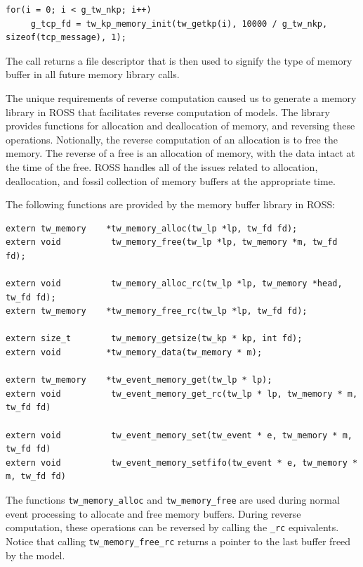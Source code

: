 \documentclass[conference,onecolumn]{IEEEtran}
\begin{document}
\begin{small}\begin{verbatim}
for(i = 0; i < g_tw_nkp; i++)
     g_tcp_fd = tw_kp_memory_init(tw_getkp(i), 10000 / g_tw_nkp, sizeof(tcp_message), 1);
\end{verbatim}\end{small}

The call returns a file descriptor that is then used to signify the type of memory buffer in all future memory library calls.

The unique requirements of reverse computation caused us to generate a memory library in ROSS that facilitates reverse computation of models.  The library provides functions for allocation and deallocation of memory, and reversing these operations.  Notionally, the reverse computation of an allocation is to free the memory.  The reverse of a free is an allocation of memory, with the data intact at the time of the free.  ROSS handles all of the issues related to allocation, deallocation, and fossil collection of memory buffers at the appropriate time.

The following functions are provided by the memory buffer library in ROSS:

\begin{small}\begin{verbatim}
extern tw_memory    *tw_memory_alloc(tw_lp *lp, tw_fd fd);
extern void          tw_memory_free(tw_lp *lp, tw_memory *m, tw_fd fd);

extern void          tw_memory_alloc_rc(tw_lp *lp, tw_memory *head, tw_fd fd);
extern tw_memory    *tw_memory_free_rc(tw_lp *lp, tw_fd fd);

extern size_t        tw_memory_getsize(tw_kp * kp, int fd);
extern void         *tw_memory_data(tw_memory * m);

extern tw_memory    *tw_event_memory_get(tw_lp * lp);
extern void          tw_event_memory_get_rc(tw_lp * lp, tw_memory * m, tw_fd fd)

extern void          tw_event_memory_set(tw_event * e, tw_memory * m, tw_fd fd)
extern void          tw_event_memory_setfifo(tw_event * e, tw_memory * m, tw_fd fd)
\end{verbatim}\end{small}

The functions {\tt tw\_memory\_alloc} and {\tt tw\_memory\_free} are used during normal event processing to allocate and free memory buffers.  During reverse computation, these operations can be reversed by calling the {\tt \_rc} equivalents.  Notice that calling {\tt tw\_memory\_free\_rc} returns a pointer to the last buffer freed by the model.
\end{document}
